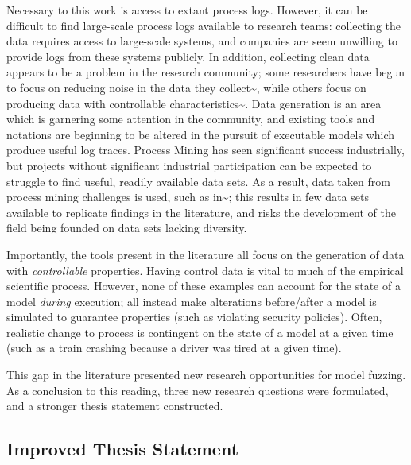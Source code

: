 \documentclass[11pt]{article}
\begin{document}
Necessary to this work is access to extant process logs. However, it can be
difficult to find large-scale process logs available to research teams:
collecting the data requires access to large-scale systems, and companies are
seem unwilling to provide logs from these systems publicly. In addition,
collecting clean data appears to be a problem in the research community; some
researchers have begun to focus on reducing noise in the data they
collect\textasciitilde{}\cite{log_noise_removal}, while others focus on producing data with
controllable characteristics\textasciitilde{}\cite{secsy,on_bp_variant_generation}. Data
generation is an area which is garnering some attention in the community, and
existing tools and notations are beginning to be altered in the pursuit of
executable models which produce useful log traces\cite{aalst_generating_logs}.
Process Mining has seen significant success industrially\cite{threegoodreasons},
but projects without significant industrial participation can be expected to
struggle to find useful, readily available data sets. As a result, data taken
from process mining challenges is used, such as in\textasciitilde{}\cite{mattia_sts}; this
results in few data sets available to replicate findings in the literature, and
risks the development of the field being founded on data sets lacking diversity.

Importantly, the tools present in the
literature\cite{secsy,aalst_generating_logs,on_bp_variant_generation} all focus
on the generation of data with \emph{controllable} properties. Having control data is
vital to much of the empirical scientific process. However, none of these
examples can account for the state of a model \emph{during} execution; all instead
make alterations before/after a model is simulated to guarantee properties (such
as violating security policies). Often, realistic change to process is
contingent on the state of a model at a given time (such as a train crashing
because a driver was tired at a given time).

This gap in the literature presented new research opportunities for model
fuzzing. As a conclusion to this reading, three new research questions were
formulated, and a stronger thesis statement constructed.

\subsection{Improved Thesis Statement}
\label{sec:orga2f09b3}
\label{subsec:improved_thesis_statement}
\end{document}
